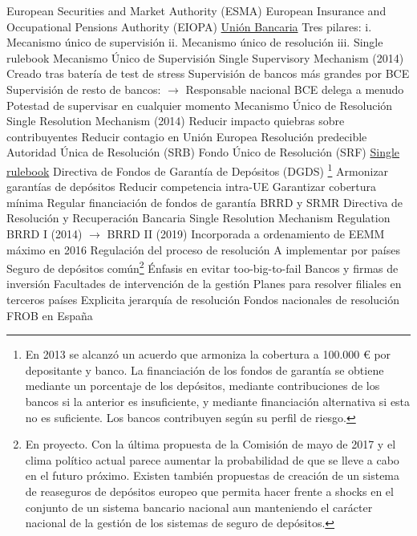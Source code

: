 \documentclass{nuevotema}
\begin{document}
\begin{esquemal}
				\4[] European Securities and Market Authority (ESMA)
				\4[] European Insurance and Occupational Pensions Authority (EIOPA)
			\3 \underline{Unión Bancaria}
				\4 Tres pilares:
				\4[] i. Mecanismo único de supervisión
				\4[] ii. Mecanismo único de resolución
				\4[] iii. Single rulebook
			\3 Mecanismo Único de Supervisión
				\4 Single Supervisory Mechanism (2014)
				\4 Creado tras batería de test de stress
				\4 Supervisión de bancos más grandes por BCE
				\4 Supervisión de resto de bancos:
				\4[] $\to$ Responsable nacional
				\4 BCE delega a menudo
				\4 Potestad de supervisar en cualquier momento
			\3 Mecanismo Único de Resolución
				\4 Single Resolution Mechanism (2014)
				\4 Reducir impacto quiebras sobre contribuyentes
				\4 Reducir contagio en Unión Europea
				\4 Resolución predecible
				\4 Autoridad Única de Resolución (SRB)
				\4 Fondo Único de Resolución (SRF)
			\3 \underline{Single rulebook}
			\3 Directiva de Fondos de Garantía de Depósitos (DGDS) \footnote{En 2013 se alcanzó un acuerdo que armoniza la cobertura a 100.000 € por depositante y banco. La financiación de los fondos de garantía se obtiene mediante un porcentaje de los depósitos, mediante contribuciones de los bancos si la anterior es insuficiente, y mediante financiación alternativa si esta no es suficiente. Los bancos contribuyen según su perfil de riesgo.}
				\4[] Armonizar garantías de depósitos
				\4[] Reducir competencia intra-UE
				\4[] Garantizar cobertura mínima
				\4[] Regular financiación de fondos de garantía
			\3 BRRD y SRMR
				\4 Directiva de Resolución y Recuperación Bancaria
				\4 Single Resolution Mechanism Regulation
				\4 BRRD I (2014) $\to$ BRRD II (2019)
				\4 Incorporada a ordenamiento de EEMM máximo en 2016
				\4[] Regulación del proceso de resolución
				\4[] A implementar por países
				\4 Seguro de depósitos común\footnote{En proyecto. Con la última propuesta de la Comisión de mayo de 2017 y el clima político actual parece aumentar la probabilidad de que se lleve a cabo en el futuro próximo. Existen también propuestas de creación de un sistema de reaseguros de depósitos europeo que permita hacer frente a shocks en el conjunto de un sistema bancario nacional aun manteniendo el carácter nacional de la gestión de los sistemas de seguro de depósitos.}
				\4 Énfasis en evitar too-big-to-fail
				\4 Bancos y firmas de inversión
				\4 Facultades de intervención de la gestión
				\4 Planes para resolver filiales en terceros países
				\4 Explicita jerarquía de resolución
				\4 Fondos nacionales de resolución
				\4[] FROB en España

\end{esquemal}
\end{document}
